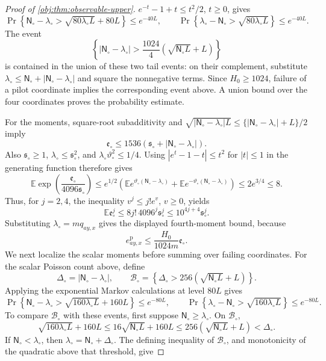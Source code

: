 \begin{proof}[Proof of \cref{obj:thm:observable-upper}]
\(e^{-t}-1+t\le t^2/2\), \(t\ge0\), gives
\[
\Pr\!\left\{
\mathsf N_\circ-\lambda_\circ>
\sqrt{80\lambda_\circ L}+80L
\right\}\le e^{-40L},
\qquad
\Pr\!\left\{
\lambda_\circ-\mathsf N_\circ>
\sqrt{80\lambda_\circ L}
\right\}\le e^{-40L}.
\]
The event
\[
\left\{
|\mathsf N_\circ-\lambda_\circ|
>\frac{1024}{4}\left(\sqrt{\mathsf N_\circ L}+L\right)
\right\}
\]
is contained in the union of these two tail events: on their complement, substitute
\(\lambda_\circ\le\mathsf N_\circ+|\mathsf N_\circ-\lambda_\circ|\) and square the nonnegative terms. Since \(H_0\ge1024\), failure of a pilot coordinate implies the corresponding event above. A union bound over the four coordinates proves the probability estimate.

For the moments, square-root subadditivity and
\(\sqrt{|\mathsf N_\circ-\lambda_\circ|L}
\le\{|\mathsf N_\circ-\lambda_\circ|+L\}/2\) imply
\[
\mathfrak e_\circ
\le1536\left(\mathfrak s_\circ+
|\mathsf N_\circ-\lambda_\circ|\right).
\]
Also \(\mathfrak s_\circ\ge1\),
\(\lambda_\circ\le\mathfrak s_\circ^2\), and
\(\lambda_\circ\vartheta_\circ^2\le1/4\). Using
\(|e^t-1-t|\le t^2\) for \(|t|\le1\) in the generating function therefore gives
\[
\mathbb E\exp\left(\frac{\mathfrak e_\circ}{4096\mathfrak s_\circ}\right)
\le
e^{1/2}\left(
\mathbb E e^{\vartheta_\circ(\mathsf N_\circ-\lambda_\circ)}
+
\mathbb E e^{-\vartheta_\circ(\mathsf N_\circ-\lambda_\circ)}
\right)
\le2e^{3/4}\le8.
\]
Thus, for \(j=2,4\), the inequality \(v^j\le j!e^v\), \(v\ge0\), yields
\[
\mathbb E\mathfrak e_\circ^j
\le8j!\,4096^j\mathfrak s_\circ^j
\le10^{4j+4}\mathfrak s_\circ^j.
\]
Substituting \(\lambda_\circ=mq_{ay,x}\) gives the displayed fourth-moment bound, because
\[
e_{ay,x}^{\mathrm p}
\le\frac{H_0}{1024m}\mathfrak e_\circ.
\]
We next localize the scalar moments before summing over failing coordinates. For the scalar Poisson count above, define
\[
\Delta_\circ=|\mathsf N_\circ-\lambda_\circ|,
\qquad
\mathcal B_\circ=
\left\{
\Delta_\circ>256\left(\sqrt{\mathsf N_\circ L}+L\right)
\right\}.
\]
Applying the exponential Markov calculations at level \(80L\) gives
\[
\Pr\!\left\{
\mathsf N_\circ-\lambda_\circ>
\sqrt{160\lambda_\circ L}+160L
\right\}\le e^{-80L},
\qquad
\Pr\!\left\{
\lambda_\circ-\mathsf N_\circ>
\sqrt{160\lambda_\circ L}
\right\}\le e^{-80L}.
\]
To compare \(\mathcal B_\circ\) with these events, first suppose \(\mathsf N_\circ\ge\lambda_\circ\). On \(\mathcal B_\circ\),
\[
\sqrt{160\lambda_\circ L}+160L
\le16\sqrt{\mathsf N_\circ L}+160L
\le256\left(\sqrt{\mathsf N_\circ L}+L\right)
<\Delta_\circ.
\]
If \(\mathsf N_\circ<\lambda_\circ\), then \(\lambda_\circ=\mathsf N_\circ+\Delta_\circ\). The defining inequality of \(\mathcal B_\circ\), and monotonicity of the quadratic above that threshold, give

\end{proof}
